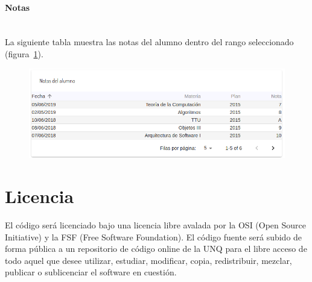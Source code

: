 \paragraph{Notas} \mbox{}\\
La siguiente tabla muestra las notas del alumno dentro del rango seleccionado (figura~\ref{fig:sa-notas}).

\begin{figure}[H]
  \centering
    \includegraphics[scale=0.4]{images/seguimiento-academico/sa-notas.png}
  \label{fig:sa-notas}
\end{figure}



\section{Licencia}
El código será licenciado bajo una licencia libre avalada por la OSI (Open Source Initiative) y la
FSF (Free Software Foundation). El código fuente será subido de forma pública a un repositorio
de código online de la UNQ para el libre acceso de todo aquel que desee utilizar, estudiar,
modificar, copia, redistribuir, mezclar, publicar o sublicenciar el software en cuestión.
